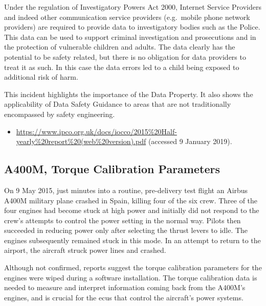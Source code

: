 Under the regulation of Investigatory Powers Act 2000, Internet Service Providers and indeed other communication service providers (e.g.\ mobile phone network providers) are required to provide data to investigatory bodies such as the Police. This data can be used to support criminal investigation and prosecutions and in the protection of vulnerable children and adults. The data clearly has the potential to be safety related, but there is no obligation for data providers to treat it as such. In this case the \glspl{data error} led to a child being exposed to additional risk of harm.

This incident highlights the importance of the  Data Property. It also shows the applicability of Data Safety Guidance to areas that are not traditionally encompassed by safety engineering.

\begin{samepage}
\begin{itemize}
  \item \raggedright{\href{https://www.ipco.org.uk/docs/iocco/2015\%20Half-yearly\%20report\%20(web\%20version).pdf}{https://www.ipco.org.uk/docs/iocco/2015\%20Half-yearly\%20report\%20(web\%20version).pdf} (accessed 9 January 2019).}
\end{itemize}
\end{samepage}


\subsection{A400M, Torque Calibration Parameters} \label{bkm:incacc:a400m}
On 9 May 2015, just minutes into a routine, pre-delivery test flight an Airbus A400M military plane crashed in Spain, killing four of the six crew. Three of the four engines had become stuck at high power and initially did not respond to the crew's attempts to control the power setting in the normal way. Pilots then succeeded in reducing power only after selecting the thrust levers to idle. The engines subsequently remained stuck in this mode. In an attempt to return to the airport, the aircraft struck power lines and crashed.  

Although not confirmed, reports suggest the torque calibration parameters for the engines were wiped during a software installation. The torque calibration data is needed to measure and interpret \gls{information} coming back from the A400M's engines, and is crucial for the \glspl{ecu} that control the aircraft's power systems. 

